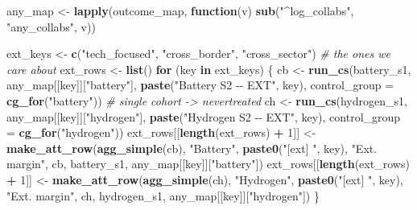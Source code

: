 \documentclass[
]{article}
\newenvironment{Shaded}{\begin{snugshade}}{\end{snugshade}}
\newcommand{\AttributeTok}[1]{\textcolor[rgb]{0.13,0.29,0.53}{#1}}
\newcommand{\CommentTok}[1]{\textcolor[rgb]{0.56,0.35,0.01}{\textit{#1}}}
\newcommand{\ControlFlowTok}[1]{\textcolor[rgb]{0.13,0.29,0.53}{\textbf{#1}}}
\newcommand{\DecValTok}[1]{\textcolor[rgb]{0.00,0.00,0.81}{#1}}
\newcommand{\FunctionTok}[1]{\textcolor[rgb]{0.13,0.29,0.53}{\textbf{#1}}}
\newcommand{\NormalTok}[1]{#1}
\newcommand{\OtherTok}[1]{\textcolor[rgb]{0.56,0.35,0.01}{#1}}
\newcommand{\SpecialCharTok}[1]{\textcolor[rgb]{0.81,0.36,0.00}{\textbf{#1}}}
\newcommand{\StringTok}[1]{\textcolor[rgb]{0.31,0.60,0.02}{#1}}
\begin{document}
\begin{Shaded}
\begin{Highlighting}[]
\NormalTok{any\_map }\OtherTok{\textless{}{-}} \FunctionTok{lapply}\NormalTok{(outcome\_map, }\ControlFlowTok{function}\NormalTok{(v) }\FunctionTok{sub}\NormalTok{(}\StringTok{"\^{}log\_collabs"}\NormalTok{, }\StringTok{"any\_collabs"}\NormalTok{, v))}

\NormalTok{ext\_keys }\OtherTok{\textless{}{-}} \FunctionTok{c}\NormalTok{(}\StringTok{"tech\_focused"}\NormalTok{, }\StringTok{"cross\_border"}\NormalTok{, }\StringTok{"cross\_sector"}\NormalTok{)  }\CommentTok{\# the ones we care about}
\NormalTok{ext\_rows }\OtherTok{\textless{}{-}} \FunctionTok{list}\NormalTok{()}
\ControlFlowTok{for}\NormalTok{ (key }\ControlFlowTok{in}\NormalTok{ ext\_keys) \{}
\NormalTok{  cb }\OtherTok{\textless{}{-}} \FunctionTok{run\_cs}\NormalTok{(battery\_s1,  any\_map[[key]][}\StringTok{"battery"}\NormalTok{],}
               \FunctionTok{paste}\NormalTok{(}\StringTok{"Battery S2 {-}{-} EXT"}\NormalTok{, key),}
               \AttributeTok{control\_group =} \FunctionTok{cg\_for}\NormalTok{(}\StringTok{"battery"}\NormalTok{))   }\CommentTok{\# single cohort {-}\textgreater{} nevertreated}
\NormalTok{  ch }\OtherTok{\textless{}{-}} \FunctionTok{run\_cs}\NormalTok{(hydrogen\_s1, any\_map[[key]][}\StringTok{"hydrogen"}\NormalTok{],}
               \FunctionTok{paste}\NormalTok{(}\StringTok{"Hydrogen S2 {-}{-} EXT"}\NormalTok{, key),}
               \AttributeTok{control\_group =} \FunctionTok{cg\_for}\NormalTok{(}\StringTok{"hydrogen"}\NormalTok{))}
\NormalTok{  ext\_rows[[}\FunctionTok{length}\NormalTok{(ext\_rows) }\SpecialCharTok{+} \DecValTok{1}\NormalTok{]] }\OtherTok{\textless{}{-}}
    \FunctionTok{make\_att\_row}\NormalTok{(}\FunctionTok{agg\_simple}\NormalTok{(cb), }\StringTok{"Battery"}\NormalTok{, }\FunctionTok{paste0}\NormalTok{(}\StringTok{"[ext] "}\NormalTok{, key), }\StringTok{"Ext. margin"}\NormalTok{,}
\NormalTok{                 cb, battery\_s1, any\_map[[key]][}\StringTok{"battery"}\NormalTok{])}
\NormalTok{  ext\_rows[[}\FunctionTok{length}\NormalTok{(ext\_rows) }\SpecialCharTok{+} \DecValTok{1}\NormalTok{]] }\OtherTok{\textless{}{-}}
    \FunctionTok{make\_att\_row}\NormalTok{(}\FunctionTok{agg\_simple}\NormalTok{(ch), }\StringTok{"Hydrogen"}\NormalTok{, }\FunctionTok{paste0}\NormalTok{(}\StringTok{"[ext] "}\NormalTok{, key), }\StringTok{"Ext. margin"}\NormalTok{,}
\NormalTok{                 ch, hydrogen\_s1, any\_map[[key]][}\StringTok{"hydrogen"}\NormalTok{])}
\NormalTok{\}}
\end{Highlighting}
\end{Shaded}
\end{document}

